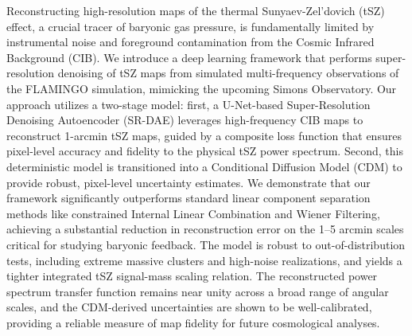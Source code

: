\documentclass[]{article}
\begin{document}
Reconstructing high-resolution maps of the thermal Sunyaev-Zel'dovich (tSZ) effect, a crucial tracer of baryonic gas pressure, is fundamentally limited by instrumental noise and foreground contamination from the Cosmic Infrared Background (CIB). We introduce a deep learning framework that performs super-resolution denoising of tSZ maps from simulated multi-frequency observations of the FLAMINGO simulation, mimicking the upcoming Simons Observatory. Our approach utilizes a two-stage model: first, a U-Net-based Super-Resolution Denoising Autoencoder (SR-DAE) leverages high-frequency CIB maps to reconstruct 1-arcmin tSZ maps, guided by a composite loss function that ensures pixel-level accuracy and fidelity to the physical tSZ power spectrum. Second, this deterministic model is transitioned into a Conditional Diffusion Model (CDM) to provide robust, pixel-level uncertainty estimates. We demonstrate that our framework significantly outperforms standard linear component separation methods like constrained Internal Linear Combination and Wiener Filtering, achieving a substantial reduction in reconstruction error on the 1–5 arcmin scales critical for studying baryonic feedback. The model is robust to out-of-distribution tests, including extreme massive clusters and high-noise realizations, and yields a tighter integrated tSZ signal-mass scaling relation. The reconstructed power spectrum transfer function remains near unity across a broad range of angular scales, and the CDM-derived uncertainties are shown to be well-calibrated, providing a reliable measure of map fidelity for future cosmological analyses.
\end{document}

